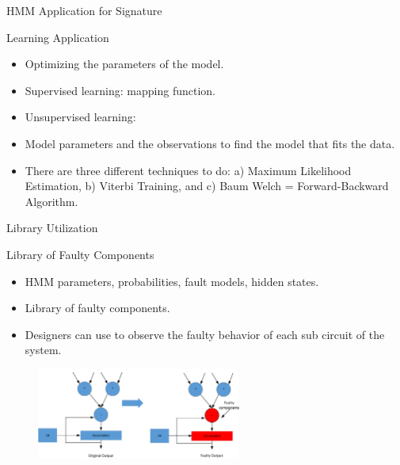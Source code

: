 \documentclass[aspectratio=1610]{beamer}
\begin{document}
\begin{frame}{HMM Application for Signature}
\vspace{-1.6cm}
\begin{block}{Learning Application}
\end{block}
\begin{itemize}

\item Optimizing the parameters of the model.

\item Supervised learning: mapping function.
\item Unsupervised learning: 

\item Model parameters and the observations to find the model that fits the data. 

\item There are three different techniques to do: a) Maximum Likelihood Estimation, b) Viterbi Training, and c) Baum  Welch = Forward-Backward Algorithm.


\end{itemize}
\end{frame}
\begin{frame}{Library Utilization}

\begin{block}{Library of Faulty Components}
\end{block}
\begin{itemize}
\item HMM parameters, probabilities, fault models, hidden states.
\item Library of faulty components.
\item Designers can use to observe the faulty behavior of each sub circuit of the system.

\end{itemize}



\begin{figure}[tb!]
 \centering
  \captionsetup{justification=centering}    
   \includegraphics[width=0.6\textwidth, center]{Figures/MAC.pdf}
\label{fig:lib1}
\end{figure}


\end{frame}
\end{document}
